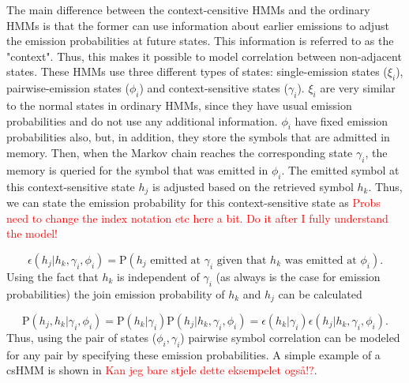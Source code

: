 \documentclass{article}
\begin{document}
The main difference between the context-censitive HMMs and the ordinary HMMs is that the former can use information about earlier emissions to adjust the emission probabilities at future states. This information is referred to as the "context". Thus, this makes it possible to model correlation between non-adjacent states. These HMMs use three different types of states: single-emission states ($\xi_i$),  pairwise-emission states ($\phi_i$) and context-sensitive states ($\gamma_i$). $\xi_i$ are very similar to the normal states in ordinary HMMs, since they have usual emission probabilities and do not use any additional information. $\phi_i$ have fixed emission probabilities also, but, in addition, they store the symbols that are admitted in memory. Then, when the Markov chain reaches the corresponding state $\gamma_i$, the memory is queried for the symbol that was emitted in $\phi_i$. The emitted symbol at this context-sensitive state $h_j$ is adjusted based on the retrieved symbol $h_k$. Thus, we can state the emission probability for this context-sensitive state as \textcolor{red}{Probs need to change the index notation etc here a bit. Do it after I fully understand the model!}

\begin{equation*}
    \epsilon(h_j|h_k, \gamma_i, \phi_i) = \text{P}(h_j\text{ emitted at }\gamma_i\text{ given that }h_k\text{ was emitted at }\phi_i).
\end{equation*}
Using the fact that $h_k$ is independent of $\gamma_i$ (as always is the case for emission probabilities) the join emission probability of $h_k$ and $h_j$ can be calculated

\begin{equation*}
    \text{P}(h_j, h_k|\gamma_i, \phi_i) = \text{P}(h_k|\gamma_i)\text{P}(h_j|h_k, \gamma_i, \phi_i) = \epsilon(h_k|\gamma_i)\epsilon(h_j|h_k, \gamma_i, \phi_i).
\end{equation*}
Thus, using the pair of states ($\phi_i, \gamma_i$) pairwise symbol correlation can be modeled for any pair by specifying these emission probabilities. A simple example of a csHMM is shown in \cite{Yoon2009} \textcolor{red}{Kan jeg bare stjele dette eksempelet også!?}. 
\end{document}
